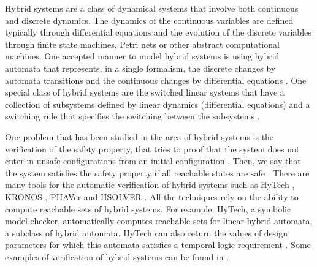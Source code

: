 
Hybrid systems are a class of dynamical systems that involve both continuous and discrete dynamics. The dynamics of the continuous variables are
defined typically through differential equations and the evolution of the discrete variables through finite state machines, Petri nets or other abstract computational machines. One accepted manner to model hybrid systems is using hybrid automata that represents, in a single formalism, the discrete changes by automata transitions and the continuous changes by differential equations \cite{DeSHee:2009,Henzinger:1997}.
One special class of hybrid systems are the switched linear systems that have a collection of subsystems defined by linear dynamics (differential equations) and a switching rule that specifies the switching between the subsystems \cite{Sun:2005}.

One problem that has been studied in the area of hybrid systems is the verification of the safety property, that tries to proof that the system does not enter in unsafe configurations from an initial configuration \cite{Tomlin:2003}. Then, we say that the system satisfies the safety property if all reachable states are safe \cite{Henzinger:1997}. There are many tools for the automatic verification of hybrid systems such as HyTech \cite{Henzinger:1997}, KRONOS \cite{Yovine:1997}, PHAVer \cite{Frehse:05} and HSOLVER \cite{Ratschan:2007}. All the techniques rely on the ability to compute reachable sets of hybrid systems. For example, HyTech, a symbolic model checker, automatically computes reachable sets for linear hybrid automata, a subclass of hybrid automata. HyTech can also return the values of design parameters for which this automata satisfies a temporal-logic requirement \cite{Henzinger:1997}. Some examples of verification of hybrid systems can be found in \cite{Henzinger:1997,Mohrenschildt:2001}.

